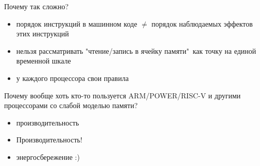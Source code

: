 % 
% 
% 
% 
% 
% 


\begin{frame}{Почему так сложно?}

\begin{itemize}
 \item порядок инструкций в машинном коде $\neq$ порядок наблюдаемых эффектов этих инструкций

 \pause
 \item нельзя рассматривать "чтение/запись в ячейку памяти"\ как точку на единой временной шкале

 \pause
 \item у каждого процессора свои правила
\end{itemize}

\pause
Почему вообще хоть кто-то пользуется ARM/POWER/RISC-V и другими процессорами со слабой моделью памяти?

\pause
\begin{itemize}
  \item производительность
  \pause
  \item Производительность!
  \pause
  \item энергосбережение :)
\end{itemize}

\end{frame}

